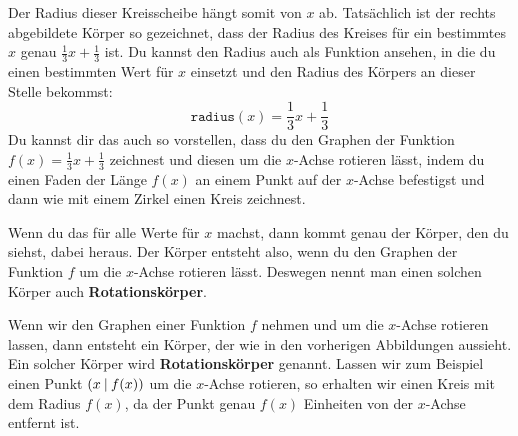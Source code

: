 \documentclass[../../main.tex]{subfiles}
\begin{document}
\begin{example}{}
    Der Radius dieser Kreisscheibe hängt somit von $x$ ab. Tatsächlich ist der rechts abgebildete Körper so gezeichnet,
    dass der Radius des Kreises für ein bestimmtes $x$ genau $\frac{1}{3}x+\frac{1}{3}$ ist. Du kannst den Radius
    auch als Funktion ansehen, in die du einen bestimmten Wert für $x$ einsetzt und den Radius des Körpers an dieser
    Stelle bekommst:
    \[\texttt{radius}(x)=\frac{1}{3}x+\frac{1}{3}\]
    Du kannst dir das auch so vorstellen, dass du den Graphen der Funktion $f(x)=\frac{1}{3}x+\frac{1}{3}$ zeichnest
    und diesen um die $x$-Achse rotieren lässt, indem du einen Faden der Länge $f(x)$ an einem Punkt auf der
    $x$-Achse befestigst und dann wie mit einem Zirkel einen Kreis zeichnest. 
    
    Wenn du das für alle Werte für $x$ machst, dann kommt genau der Körper, den du siehst, dabei heraus. Der Körper
    entsteht also, wenn du den Graphen der Funktion $f$ um die $x$-Achse rotieren lässt. Deswegen nennt man einen
    solchen Körper auch \textbf{Rotationskörper}.
\end{example}
Wenn wir den Graphen einer Funktion $f$ nehmen und um die $x$-Achse rotieren lassen, dann entsteht ein Körper, der wie
in den vorherigen Abbildungen aussieht. Ein solcher Körper wird \textbf{Rotationskörper} genannt.
Lassen wir zum Beispiel einen Punkt $\left(x \:\middle|\: f(x)\right)$ um die $x$-Achse rotieren, 
so erhalten wir einen Kreis mit dem Radius $f(x)$, da der Punkt genau $f(x)$ Einheiten von der $x$-Achse entfernt ist.
\end{document}

